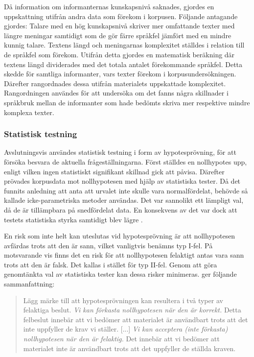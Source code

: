 \documentclass[12pt,a4paper]{article}
\begin{document}
Då information om informanternas kunskapsnivå saknades, gjordes en uppskattning utifrån andra data som förekom i korpusen. Följande antagande gjordes: Talare med en hög kunskapsnivå skriver mer omfattande texter med längre meningar samtidigt som de gör färre språkfel jämfört med en mindre kunnig talare. Textens längd och meningarnas komplexitet ställdes i relation till de språkfel som förekom. Utifrån detta gjordes en matematisk beräkning där textens längd dividerades med det totala antalet förekommande språkfel. Detta skedde för samtliga informanter, vars texter förekom i korpusundersökningen. Därefter rangordnades dessa utifrån materialets uppskattade komplexitet. Rangordningen användes för att undersöka om det fanns några skillnader i språkbruk mellan de informanter som hade bedömts skriva mer respektive mindre komplexa texter.

\subsubsection{Statistisk testning}
\label{subsec:Undersökningen: Tillvägagångssätt: Statistisk testning}
Avslutningsvis användes statistisk testning i form av hypotesprövning, för att försöka besvara de aktuella frågeställningarna. Först ställdes en nollhypotes upp, enligt vilken ingen statistiskt signifikant skillnad gick att påvisa. Därefter prövades korpusdata mot nollhypotesen med hjälp av statistiska tester. Då det funnits anledning att anta att urvalet inte skulle vara normalfördelat, behövde så kallade icke-parametriska metoder användas. Det var sannolikt ett lämpligt val, då de är tillämpbara på snedfördelat data. En konsekvens av det var dock att testets statistiska styrka samtidigt blev lägre \autocite{henriksson2008}.

En risk som inte helt kan uteslutas vid hypotesprövning är att nollhypotesen avfärdas trots att den är sann, vilket vanligtvis benämns typ I-fel. På motsvarande vis finns det en risk för att nollhypotesen felaktigt antas vara sann trots att den är falsk. Det kallas i stället för typ II-fel. Genom att göra genomtänkta val av statistiska tester kan dessa risker minimeras. \textcite[206]{körner2015} ger följande sammanfattning:

\blockquote{Lägg märke till att hypotesprövningen kan resultera i två typer av felaktiga beslut. \emph{Vi kan förkasta nollhypotesen när den är korrekt.} Detta felbeslut innebär att vi bedömer att materialet är användbart trots att det inte uppfyller de krav vi ställer. [...] \emph{Vi kan acceptera (inte förkasta) nollhypotesen när den är felaktig.} Det innebär att vi bedömer att materialet inte är användbart trots att det uppfyller de ställda kraven.}
\end{document}
